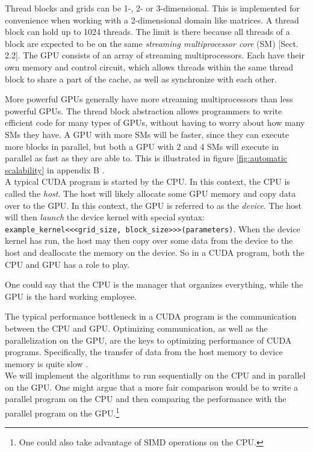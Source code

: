 Thread blocks and grids can be 1-, 2- or 3-dimensional. This is implemented for convenience when working with a 2-dimensional domain like matrices. A thread block can hold up to 1024 threads. The limit is there because all threads of a block are expected to be on the same \textit{streaming multiprocessor core} (SM) [Sect. 2.2]\cite{nvidia:cudadoc}. The GPU consists of an array of streaming multiprocessors. Each have their own memory and control circuit, which allows threads within the same thread block to share a part of the cache, as well as synchronize with each other. 

More powerful GPUs generally have more streaming multiprocessors than less powerful GPUs. The thread block abstraction allows programmers to write efficient code for many types of GPUs, without having to worry about how many SMs they have. A GPU with more SMs will be faster, since they can execute more blocks in parallel, but both a GPU with 2 and 4 SMs will execute in parallel as fast as they are able to. This is illustrated in figure \ref{fig:automatic scalability} in appendix B \cite[Sect. 1.3]{nvidia:cudadoc}.\\

\noindent A typical CUDA program is started by the CPU. In this context, the CPU is called the \textit{host}. The host will likely allocate some GPU memory and copy data over to the GPU. In this context, the GPU is referred to as the \textit{device}. The host will then \textit{launch} the device kernel with special syntax: \texttt{example\_kernel<<<grid\_size, block\_size>>>(parameters)}. When the device kernel has run, the host may then copy over some data from the device to the host and deallocate the memory on the device. So in a CUDA program, both the CPU and GPU has a role to play. 

One could say that the CPU is the manager that organizes everything, while the GPU is the hard working employee.

The typical performance bottleneck in a CUDA program is the communication between the CPU and GPU. Optimizing communication, as well as the parallelization on the GPU, are the keys to optimizing performance of CUDA programs. Specifically, the transfer of data from the host memory to device memory is quite slow \cite[Sect. 5.3.1]{nvidia:cudadoc}.\\

\noindent We will implement the algorithms to run sequentially on the CPU and in parallel on the GPU. One might argue that a more fair comparison would be to write a parallel program on the CPU and then comparing the performance with the parallel program on the GPU.\footnote{One could also take advantage of SIMD operations on the CPU.}


